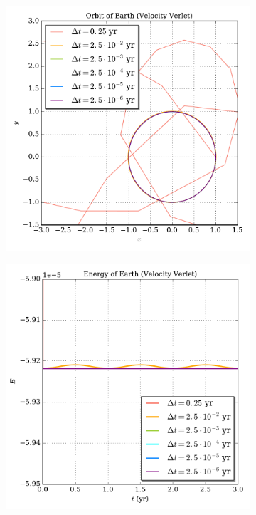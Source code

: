 \documentclass[prb,aps,twocolumn,showpacs,10pt]{revtex4-1}
\begin{document}
\begin{figure}
\centering
\begin{subfigure}{.5\textwidth}
  \centering
  \includegraphics[width=\linewidth]{binary_fixed_vv_orbit.pdf}
  \caption{\vspace*{1mm}}
  \label{fig:sub1}
\end{subfigure}%
\begin{subfigure}{.5\textwidth}
  \centering
  \includegraphics[width=\linewidth]{binary_fixed_vv_energy.pdf}

\end{subfigure}
\end{figure}
\end{document}
